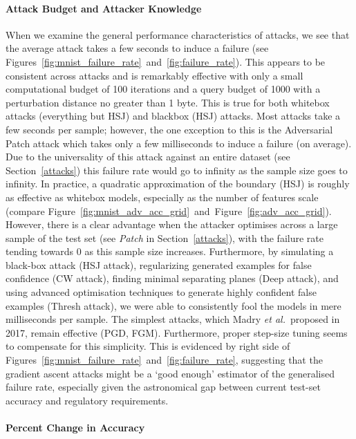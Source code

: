 \paragraph{Attack Budget and Attacker Knowledge}
When we examine the general performance characteristics of attacks, we see that the average attack takes a few seconds to induce a failure (see Figures~\ref{fig:mnist_failure_rate}~and~\ref{fig:failure_rate}).
This appears to be consistent across attacks and is remarkably effective with only a small computational budget of 100 iterations and a query budget of 1000 with a perturbation distance no greater than 1 byte.
This is true for both whitebox attacks  (everything but HSJ) and blackbox (HSJ) attacks.
Most attacks take a few seconds per sample; however, the one exception to this is the Adversarial Patch attack which takes only a few milliseconds to induce a failure (on average).
Due to the universality of this attack against an entire dataset (see Section~\ref{attacks}) this failure rate would go to infinity as the sample size goes to infinity.
In practice, a quadratic approximation of the boundary (HSJ) is roughly as effective as whitebox models, especially as the number of features scale (compare Figure~\ref{fig:mnist_adv_acc_grid}~and~Figure~\ref{fig:adv_acc_grid}).
However, there is a clear advantage when the attacker optimises across a large sample of the test set (see \textit{Patch} in Section~\ref{attacks}), with the failure rate tending towards 0 as this sample size increases.
Furthermore, by simulating a black-box attack (HSJ attack), regularizing generated examples for false confidence (CW attack), finding minimal separating planes (Deep attack),  and using advanced optimisation techniques to generate highly confident false examples (Thresh attack), we were able to consistently fool the models in mere milliseconds per sample.
The simplest attacks, which Madry \textit{et al.}~proposed in 2017, remain effective (PGD, FGM).
Furthermore, proper step-size tuning seems to compensate for this simplicity.
This is evidenced by right side of Figures~\ref{fig:mnist_failure_rate}~and~\ref{fig:failure_rate}, suggesting that the gradient ascent attacks might be a `good enough' estimator of the generalised failure rate, especially given the astronomical gap between current test-set accuracy and regulatory requirements.


\paragraph{Percent Change in Accuracy}

